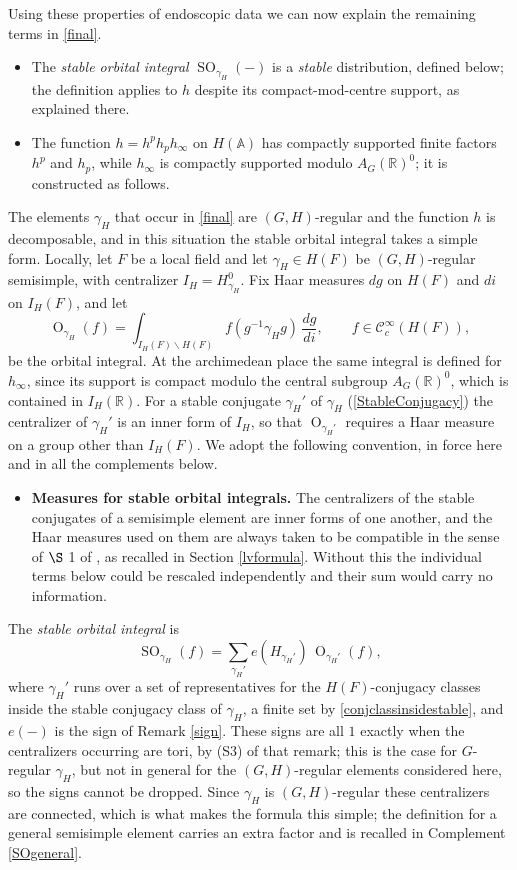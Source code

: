 \documentclass[11pt,a4paper]{article}
\theoremstyle{definition}
\theoremstyle{plain}
\theoremstyle{remark}
\theoremstyle{plain}
\DeclareMathOperator{\Or}{O}
\DeclareMathOperator{\SO}{SO}
\begin{document}
Using these properties of endoscopic data we can now explain the remaining terms in \eqref{final}.

\begin{itemize}
    \item The \textit{stable orbital integral} $\SO_{\gamma_H}(-)$ is a \textit{stable} distribution, defined below; the definition applies to $h$ despite its compact-mod-centre support, as explained there.
    \item The function $h=h^ph_ph_{\infty}$ on $H(\mathbb{A})$ has compactly supported finite factors $h^p$ and $h_p$, while $h_{\infty}$ is compactly supported modulo $A_G(\mathbb{R})^0$; it is constructed as follows.
\end{itemize}

The elements $\gamma_H$ that occur in \eqref{final} are $(G,H)$-regular and the function $h$ is decomposable, and in this situation the stable orbital integral takes a simple form. Locally, let $F$ be a local field and let $\gamma_H \in H(F)$ be $(G,H)$-regular semisimple, with centralizer $I_H = H_{\gamma_H}^0$. Fix Haar measures $dg$ on $H(F)$ and $di$ on $I_H(F)$, and let
$$\Or_{\gamma_H}(f) = \int_{I_H(F) \backslash H(F)} f(g^{-1} \gamma_H g) \, \frac{dg}{di}, \qquad f \in \mathcal{C}_c^{\infty}(H(F)),$$
be the orbital integral. At the archimedean place the same integral is defined for $h_{\infty}$, since its support is compact modulo the central subgroup $A_G(\mathbb{R})^0$, which is contained in $I_H(\mathbb{R})$. For a stable conjugate $\gamma_H'$ of $\gamma_H$ (\ref{StableConjugacy}) the centralizer of $\gamma_H'$ is an inner form of $I_H$, so that $\Or_{\gamma_H'}$ requires a Haar measure on a group other than $I_H(F)$. We adopt the following convention, in force here and in all the complements below.
\begin{itemize}
    \item \textbf{Measures for stable orbital integrals.} The centralizers of the stable conjugates of a semisimple element are inner forms of one another, and the Haar measures used on them are always taken to be compatible in the sense of $\S$ 1 of \cite{MR942522}, as recalled in Section \ref{lvformula}. Without this the individual terms below could be rescaled independently and their sum would carry no information.
\end{itemize} The \textit{stable orbital integral} is
$$\SO_{\gamma_H}(f) = \sum_{\gamma_H'} e(H_{\gamma_H'}) \, \Or_{\gamma_H'}(f),$$
where $\gamma_H'$ runs over a set of representatives for the $H(F)$-conjugacy classes inside the stable conjugacy class of $\gamma_H$, a finite set by \ref{conjclassinsidestable}, and $e(-)$ is the sign of Remark \ref{sign}. These signs are all $1$ exactly when the centralizers occurring are tori, by (S3) of that remark; this is the case for $G$-regular $\gamma_H$, but not in general for the $(G,H)$-regular elements considered here, so the signs cannot be dropped. Since $\gamma_H$ is $(G,H)$-regular these centralizers are connected, which is what makes the formula this simple; the definition for a general semisimple element carries an extra factor and is recalled in Complement \ref{SOgeneral}.
\end{document}
